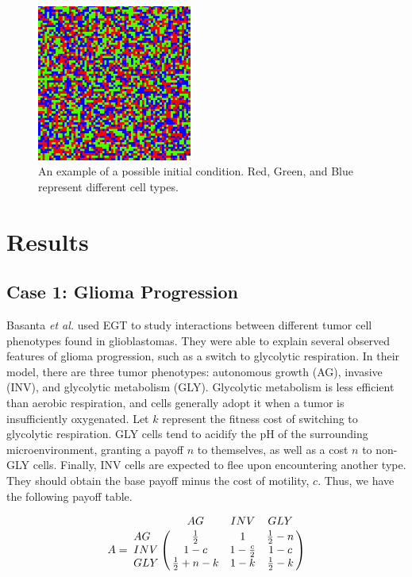 \documentclass[12pt]{report}
\begin{document}
\begin{figure}[t]
\caption{An example of a possible initial condition. Red, Green, and Blue represent different cell types.}
\centering
\includegraphics[width = 2in]{Diagrams/General/even_random_mix}
\end{figure}

\chapter*{Results}


\section*{Case 1: Glioma Progression}
Basanta \textit{et al.} used EGT to study interactions between different tumor cell phenotypes found in glioblastomas. They were able to explain several observed features of glioma progression, such as a switch to glycolytic respiration. In their model, there are three tumor phenotypes: autonomous growth (AG), invasive (INV), and glycolytic metabolism (GLY). Glycolytic metabolism is less efficient than aerobic respiration, and cells generally adopt it when a tumor is insufficiently oxygenated. Let $k$ represent the fitness cost of switching to glycolytic respiration. GLY cells tend to acidify the pH of the surrounding microenvironment, granting a payoff $n$ to themselves, as well as a cost $n$ to non-GLY cells. Finally, INV cells are expected to flee upon encountering another type. They should obtain the base payoff minus the cost of motility, $c$. Thus, we have the following payoff table. 

$$A = \bordermatrix{\text{}& AG & INV & GLY\cr
                AG & \frac{1}{2} & 1 & \frac{1}{2} - n \cr
                INV & 1 - c  &  1 - \frac{c}{2} & 1 - c \cr
                GLY & \frac{1}{2}+n-k & 1-k & \frac{1}{2}-k \cr
               }$$


\end{document}
